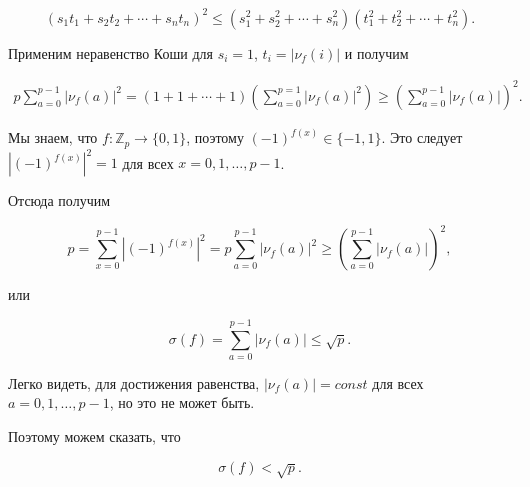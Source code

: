 \documentclass{article}
\newcommand{\ZZ}{\mathbb{Z}}
\begin{document}
\begin{equation*}
    (s_1 t_1 + s_2 t_2 + \cdots + s_n t_n)^2 \leqslant (s_1^2 + s_2^2 + \cdots + s_n^2)(t_1^2 + t_2^2 + \cdots + t_n^2).
\end{equation*}

Применим неравенство Коши для $s_i = 1$, $t_i = \lvert \nu_f(i) \rvert$ и получим

\begin{align*}
    p\sum_{a = 0}^{p - 1} \lvert \nu_f(a) \rvert^2 = (1 + 1 + \cdots + 1) \left(\sum_{a = 0}^{p = 1} \lvert\nu_f(a)\rvert^2\right) \geqslant \left(\sum_{a=0}^{p-1}\lvert \nu_f(a) \rvert\right)^2.
\end{align*}

Мы знаем, что $f: \ZZ_p \to \{ 0, 1 \}$, поэтому $(-1)^{f(x)} \in \{ -1, 1 \}$. Это следует $\left|(-1)^{f(x)}\right|^2 = 1$ для всех $x = 0, 1, \ldots, p - 1$.

Отсюда получим

\begin{equation*}
    p = \sum_{x = 0}^{p - 1} \left|(-1)^{f(x)}\right|^2 = p\sum_{a = 0}^{p-1}\left|\nu_f(a)\right|^2 \geqslant \left(\sum_{a=0}^{p-1}\left|\nu_f(a)\right|\right)^2,
\end{equation*}

или

\begin{equation*}
    \sigma(f) = \sum_{a = 0}^{p - 1}\left|\nu_f(a)\right| \leqslant \sqrt{p}.
\end{equation*}

Легко видеть, для достижения равенства, $\left|\nu_f(a)\right| = const$ для всех $a = 0, 1, \ldots, p-1$, но это не может быть.

Поэтому можем сказать, что

\begin{equation*}
    \sigma(f) < \sqrt{p}.
\end{equation*}
\end{document}
